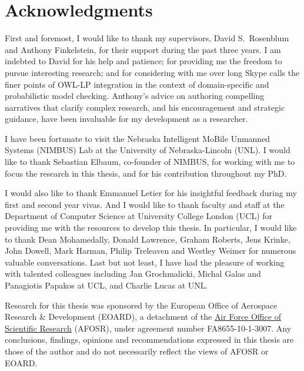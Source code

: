 \chapter*{Acknowledgments}

First and foremost, I would like to thank my supervisors, David S.~Rosenblum and Anthony Finkelstein, for their support during the past three years. I am indebted to David for his help and patience; for providing me the freedom to pursue interesting research; and for considering with me over long Skype calls the finer points of OWL-LP integration in the context of domain-specific and probabilistic model checking. Anthony's advice on authoring compelling narratives that clarify complex research, and his encouragement and strategic guidance, have been invaluable for my development as a researcher.

I have been fortunate to visit the Nebraska Intelligent MoBile Unmanned Systems (NIMBUS) Lab at the University of Nebraska-Lincoln (UNL). I would like to thank Sebastian Elbaum, co-founder of NIMBUS, for working with me to focus the research in this thesis, and for his contribution throughout my PhD\@.

I would also like to thank Emmanuel Letier for his insightful feedback during my first and second year vivas. And I would like to thank faculty and staff at the Department of Computer Science at University College London (UCL) for providing me with the resources to develop this thesis. In particular, I would like to thank Dean Mohamedally, Donald Lawrence, Graham Roberts, Jens Krinke, John Dowell, Mark Harman, Philip Treleaven and Westley Weimer for numerous valuable conversations. Last but not least, I have had the pleasure of working with talented colleagues including Jan Grochmalicki, Michal Galas and Panagiotis Papakos at UCL, and Charlie Lucas at UNL\@.

Research for this thesis was sponsored by the European Office of Aerospace Research \& Development (EOARD), a detachment of the \href{http://www.afosr.af.mil/}{Air Force Office of Scientific Research} (AFOSR), under agreement number FA8655-10-1-3007. Any conclusions, findings, opinions and recommendations expressed in this thesis are those of the author and do not necessarily reflect the views of AFOSR or EOARD\@.
